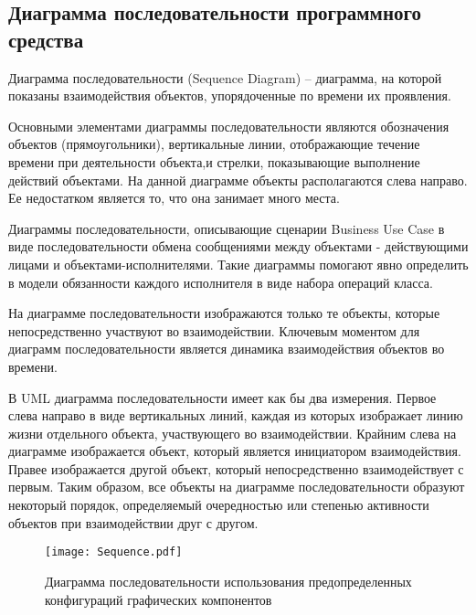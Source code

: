 \subsection{Диаграмма последовательности программного средства}
\label{sec:modeling:sequence_diagram}

Диаграмма последовательности (Sequence Diagram) – диаграмма, на которой показаны взаимодействия объектов, упорядоченные по времени их проявления.

Основными элементами диаграммы последовательности являются обозначения объектов (прямоугольники), вертикальные линии, отображающие течение времени при деятельности объекта,и стрелки, показывающие выполнение действий объектами. На данной диаграмме объекты располагаются слева направо. Ее недостатком является то, что она занимает много места.

Диаграммы последовательности, описывающие сценарии Business Use Case в виде последовательности обмена сообщениями между объектами - действующими лицами и объектами-исполнителями. Такие диаграммы помогают явно определить в модели обязанности каждого исполнителя в виде набора операций класса.

На диаграмме последовательности изображаются только те объекты, которые непосредственно участвуют во взаимодействии. Ключевым моментом для диаграмм последовательности является динамика взаимодействия объектов во времени.

В UML диаграмма последовательности имеет как бы два измерения. Первое слева направо в виде вертикальных линий, каждая из которых изображает линию жизни отдельного объекта, участвующего во взаимодействии. Крайним слева на диаграмме изображается объект, который является инициатором взаимодействия. Правее изображается другой объект, который непосредственно взаимодействует с первым. Таким образом, все объекты на диаграмме последовательности образуют некоторый порядок, определяемый очередностью или степенью активности объектов при взаимодействии друг с другом.

\begin{figure}
\centering
    \texttt{[image: Sequence.pdf]}
    \caption{Диаграмма последовательности использования предопределенных конфигураций графических компонентов}
    \label{sec:analysis:sequence}
\end{figure}